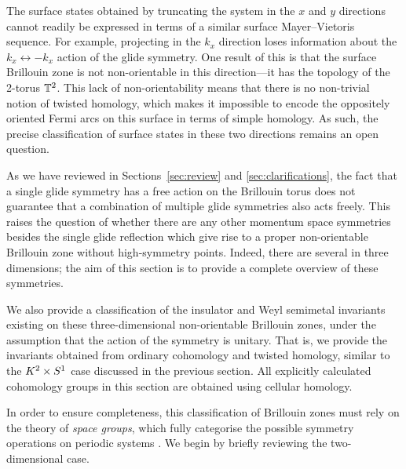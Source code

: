 The surface states obtained by truncating the system in the $x$ and $y$ directions cannot readily be expressed in terms of a similar surface Mayer--Vietoris sequence. For example, projecting in the $k_x$ direction loses information about the $k_x\leftrightarrow-k_x$ action of the glide symmetry. One result of this is that the surface Brillouin zone is not non-orientable in this direction---it has the topology of the 2-torus $\mathbb{T}^2$. This lack of non-orientability means that there is no non-trivial notion of twisted homology, which makes it impossible to encode the oppositely oriented Fermi arcs on this surface in terms of simple homology. As such, the precise classification of surface states in these two directions remains an open question.


 \label{sec:non-ori_classification}

As we have reviewed in Sections~\ref{sec:review} and \ref{sec:clarifications}, the fact that a single glide symmetry has a free action on the Brillouin torus does not guarantee that a combination of multiple glide symmetries also acts freely. This raises the question of whether there are any other momentum space symmetries besides the single glide reflection which give rise to a proper non-orientable Brillouin zone without high-symmetry points. Indeed, there are several in three dimensions; the aim of this section is to provide a complete overview of these symmetries. 

We also provide a classification of the insulator and Weyl semimetal invariants existing on these three-dimensional non-orientable Brillouin zones, under the assumption that the action of the symmetry is unitary. That is, we provide the invariants obtained from ordinary cohomology and twisted homology, similar to the $K^2\times S^1$ case discussed in the previous section. All explicitly calculated cohomology groups in this section are obtained using cellular homology.

In order to ensure completeness, this classification of Brillouin zones must rely on the theory of \emph{space groups}, which fully categorise the possible symmetry operations on periodic systems \cite{ITC_A}. We begin by briefly reviewing the two-dimensional case.

